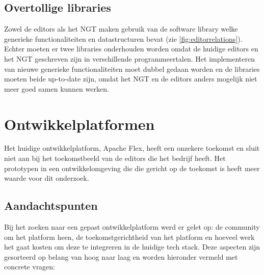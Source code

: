 \subsection{Overtollige libraries}
Zowel de editors als het NGT maken gebruik van de \organisation{} software library welke generieke functionaliteiten en datastructuren bevat (zie \autoref{fig:editorrelations}). Echter moeten er twee libraries onderhouden worden omdat de huidige editors en het NGT geschreven zijn in verschillende programmeertalen. Het implementeren van nieuwe generieke functionaliteiten moet dubbel gedaan worden en de libraries moeten beide up-to-date zijn, omdat het NGT en de editors anders mogelijk niet meer goed samen kunnen werken.

\pagebreak
\section{Ontwikkelplatformen}
Het huidige ontwikkelplatform, Apache Flex, heeft een onzekere toekomst en sluit niet aan bij het toekomstbeeld van de editors die het bedrijf heeft. Het prototypen in een ontwikkelomgeving die die gericht op de toekomst is heeft meer waarde voor dit onderzoek.

\subsection{Aandachtspunten}
Bij het zoeken naar een gepast ontwikkelplatform werd er gelet op: de community om het platform heen, de toekomstgerichtheid van het platform en hoeveel werk het gaat kosten om deze te integreren in de huidige tech stack. Deze aspecten zijn gesorteerd op belang van hoog naar laag en worden hieronder vermeld met concrete vragen:

